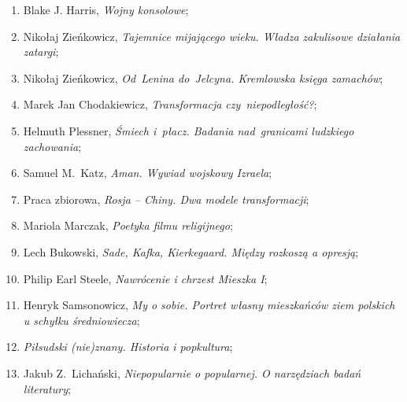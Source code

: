 \documentclass[a4paper,11pt]{article}
\begin{document}
\begin{enumerate}
\item Blake J. Harris, \textit{Wojny konsolowe};



\item Nikołaj Zieńkowicz, \textit{Tajemnice mijającego wieku. Władza
    zakulisowe działania zatargi};



\item Nikołaj Zieńkowicz, \textit{Od~Lenina do~Jelcyna. Kremlowska
    księga zamachów};



\item Marek Jan Chodakiewicz, \textit{Transformacja czy~niepodległość?};



\item Helmuth Plessner, \textit{Śmiech i~płacz. Badania nad~granicami
    ludzkiego zachowania};



\item Samuel M.~Katz, \textit{Aman. Wywiad wojskowy Izraela};



\item Praca zbiorowa, \textit{Rosja -- Chiny. Dwa modele transformacji};



\item Mariola Marczak, \textit{Poetyka filmu religijnego};



\item Lech Bukowski, \textit{Sade, Kafka, Kierkegaard. Między rozkoszą a
    opresją};



\item Philip Earl Steele, \textit{Nawrócenie i chrzest Mieszka I};



\item Henryk Samsonowicz, \textit{My o sobie. Portret własny mieszkańców
    ziem polskich u schyłku średniowiecza};



\item \textit{Piłsudski (nie)znany. Historia i popkultura};



\item Jakub Z.~Lichański, \textit{Niepopularnie o popularnej. O
    narzędziach badań literatury};




\end{enumerate}
\end{document}
